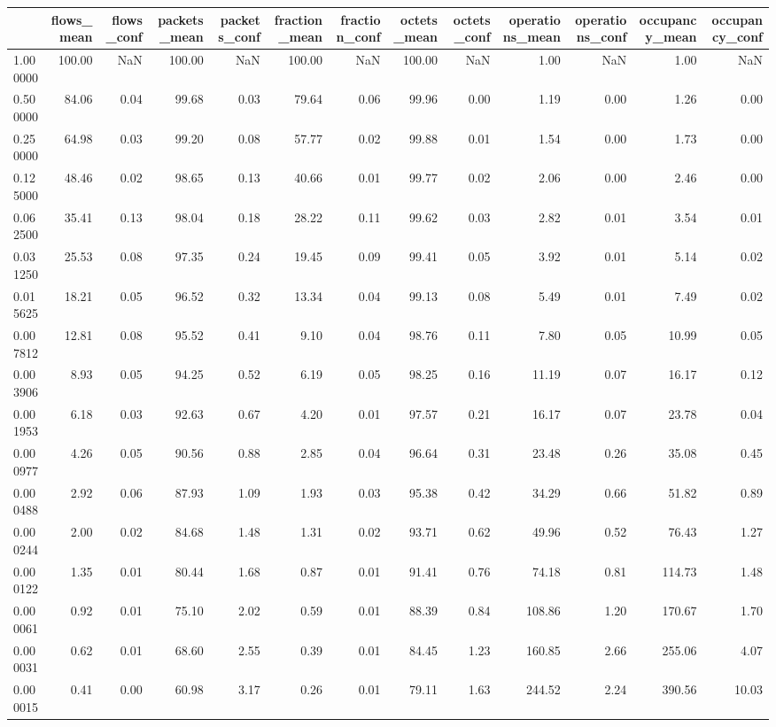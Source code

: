 \begin{tabular}{lrrrrrrrrrrrr}
\toprule
 & flows_mean & flows_conf & packets_mean & packets_conf & fraction_mean & fraction_conf & octets_mean & octets_conf & operations_mean & operations_conf & occupancy_mean & occupancy_conf \\
\midrule
1.000000 & 100.00 & NaN & 100.00 & NaN & 100.00 & NaN & 100.00 & NaN & 1.00 & NaN & 1.00 & NaN \\
0.500000 & 84.06 & 0.04 & 99.68 & 0.03 & 79.64 & 0.06 & 99.96 & 0.00 & 1.19 & 0.00 & 1.26 & 0.00 \\
0.250000 & 64.98 & 0.03 & 99.20 & 0.08 & 57.77 & 0.02 & 99.88 & 0.01 & 1.54 & 0.00 & 1.73 & 0.00 \\
0.125000 & 48.46 & 0.02 & 98.65 & 0.13 & 40.66 & 0.01 & 99.77 & 0.02 & 2.06 & 0.00 & 2.46 & 0.00 \\
0.062500 & 35.41 & 0.13 & 98.04 & 0.18 & 28.22 & 0.11 & 99.62 & 0.03 & 2.82 & 0.01 & 3.54 & 0.01 \\
0.031250 & 25.53 & 0.08 & 97.35 & 0.24 & 19.45 & 0.09 & 99.41 & 0.05 & 3.92 & 0.01 & 5.14 & 0.02 \\
0.015625 & 18.21 & 0.05 & 96.52 & 0.32 & 13.34 & 0.04 & 99.13 & 0.08 & 5.49 & 0.01 & 7.49 & 0.02 \\
0.007812 & 12.81 & 0.08 & 95.52 & 0.41 & 9.10 & 0.04 & 98.76 & 0.11 & 7.80 & 0.05 & 10.99 & 0.05 \\
0.003906 & 8.93 & 0.05 & 94.25 & 0.52 & 6.19 & 0.05 & 98.25 & 0.16 & 11.19 & 0.07 & 16.17 & 0.12 \\
0.001953 & 6.18 & 0.03 & 92.63 & 0.67 & 4.20 & 0.01 & 97.57 & 0.21 & 16.17 & 0.07 & 23.78 & 0.04 \\
0.000977 & 4.26 & 0.05 & 90.56 & 0.88 & 2.85 & 0.04 & 96.64 & 0.31 & 23.48 & 0.26 & 35.08 & 0.45 \\
0.000488 & 2.92 & 0.06 & 87.93 & 1.09 & 1.93 & 0.03 & 95.38 & 0.42 & 34.29 & 0.66 & 51.82 & 0.89 \\
0.000244 & 2.00 & 0.02 & 84.68 & 1.48 & 1.31 & 0.02 & 93.71 & 0.62 & 49.96 & 0.52 & 76.43 & 1.27 \\
0.000122 & 1.35 & 0.01 & 80.44 & 1.68 & 0.87 & 0.01 & 91.41 & 0.76 & 74.18 & 0.81 & 114.73 & 1.48 \\
0.000061 & 0.92 & 0.01 & 75.10 & 2.02 & 0.59 & 0.01 & 88.39 & 0.84 & 108.86 & 1.20 & 170.67 & 1.70 \\
0.000031 & 0.62 & 0.01 & 68.60 & 2.55 & 0.39 & 0.01 & 84.45 & 1.23 & 160.85 & 2.66 & 255.06 & 4.07 \\
0.000015 & 0.41 & 0.00 & 60.98 & 3.17 & 0.26 & 0.01 & 79.11 & 1.63 & 244.52 & 2.24 & 390.56 & 10.03 \\

\end{tabular}
